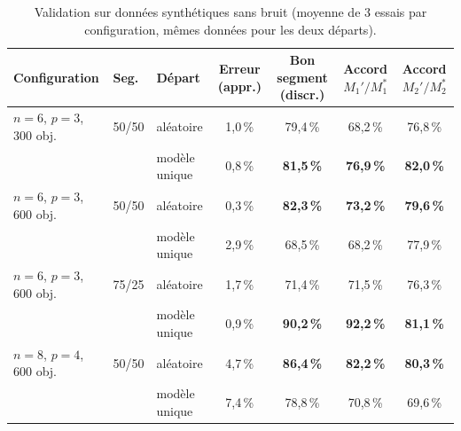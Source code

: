 \documentclass[11pt,a4paper]{article}
\begin{document}
\begin{table}[h]
\centering
\small
\setlength{\tabcolsep}{4pt}
\begin{tabularx}{\textwidth}{lllCCCC}
\toprule
Configuration & Seg. & Départ & Erreur (appr.) & Bon segment (discr.) & Accord $M_1'/M_1^*$ & Accord $M_2'/M_2^*$ \\
\midrule
$n=6$, $p=3$, 300 obj. & 50/50 & aléatoire     & 1,0\,\% & 79,4\,\% & 68,2\,\% & 76,8\,\% \\
                       &       & modèle unique & 0,8\,\% & \textbf{81,5\,\%} & \textbf{76,9\,\%} & \textbf{82,0\,\%} \\
\addlinespace
$n=6$, $p=3$, 600 obj. & 50/50 & aléatoire     & 0,3\,\% & \textbf{82,3\,\%} & \textbf{73,2\,\%} & \textbf{79,6\,\%} \\
                       &       & modèle unique & 2,9\,\% & 68,5\,\% & 68,2\,\% & 77,9\,\% \\
\addlinespace
$n=6$, $p=3$, 600 obj. & 75/25 & aléatoire     & 1,7\,\% & 71,4\,\% & 71,5\,\% & 76,3\,\% \\
                       &       & modèle unique & 0,9\,\% & \textbf{90,2\,\%} & \textbf{92,2\,\%} & \textbf{81,1\,\%} \\
\addlinespace
$n=8$, $p=4$, 600 obj. & 50/50 & aléatoire     & 4,7\,\% & \textbf{86,4\,\%} & \textbf{82,2\,\%} & \textbf{80,3\,\%} \\
                       &       & modèle unique & 7,4\,\% & 78,8\,\% & 70,8\,\% & 69,6\,\% \\
\bottomrule
\end{tabularx}
\caption{Validation sur données synthétiques sans bruit (moyenne de 3 essais par configuration, mêmes données
pour les deux départs).}
\label{tab:validation}
\end{table}
\end{document}
